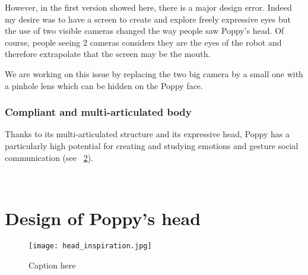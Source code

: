 \begin{figure}[]
\centering
    \hfil
    \caption{}
    \label{fig:poppy_beta_head}
\end{figure}

However, in the first version showed here, there is a major design error. Indeed my desire was to have a screen to create and explore freely expressive eyes but the use of two visible cameras changed the way people saw Poppy's head. Of course, people seeing 2 cameras considers they are the eyes of the robot and therefore extrapolate that the screen may be the mouth.

We are working on this issue by replacing the two big camera by a small one with a pinhole lens which can be hidden on the Poppy face.


\subsubsection{Compliant and multi-articulated body} %

Thanks to its multi-articulated structure and its expressive head, Poppy has a particularly high potential for creating and studying emotions and gesture social communication (see \figurename~\ref{fig:TER_cognitic}).

\begin{figure}[]
\centering
    \hfil
    \\
    \hfil
    \caption{}
    \label{fig:TER_cognitic}
\end{figure}



\section{Design of Poppy's head} %

\begin{figure}[tb]
    \begin{center}
        \texttt{[image: head\_inspiration.jpg]}
    \end{center}
    \caption{Caption here}
    \label{fig:figure1}
\end{figure}

